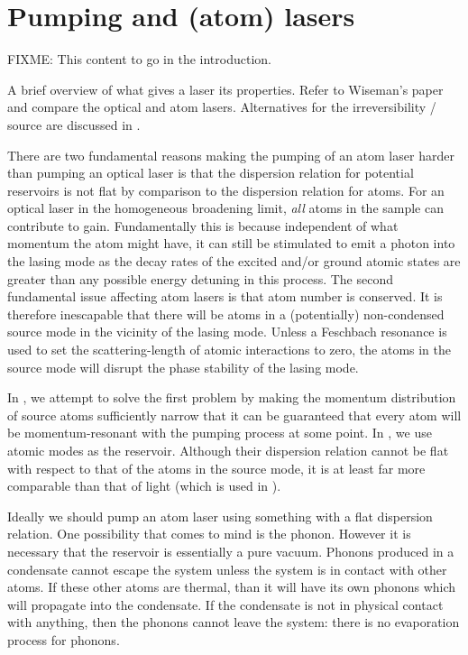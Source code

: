\section{Pumping and (atom) lasers}
\label{BackgroundTheory:Lasers}

FIXME: This content to go in the introduction.

A brief overview of what gives a laser its properties. Refer to Wiseman's paper~\citep{Wiseman:1997ba} and compare the optical and atom lasers. Alternatives for the irreversibility / source are discussed in .

There are two fundamental reasons making the pumping of an atom laser harder than pumping an optical laser is that the dispersion relation for potential reservoirs is not flat by comparison to the dispersion relation for atoms.  For an optical laser in the homogeneous broadening limit, \emph{all} atoms in the sample can contribute to gain.  Fundamentally this is because independent of what momentum the atom might have, it can still be stimulated to emit a photon into the lasing mode as the decay rates of the excited and/or ground atomic states are greater than any possible energy detuning in this process.  The second fundamental issue affecting atom lasers is that atom number is conserved.  It is therefore inescapable that there will be atoms in a (potentially) non-condensed source mode in the vicinity of the lasing mode.  Unless a Feschbach resonance is used to set the scattering-length of atomic interactions to zero, the atoms in the source mode will disrupt the phase stability of the lasing mode.

In , we attempt to solve the first problem by making the momentum distribution of source atoms sufficiently narrow that it can be guaranteed that every atom will be momentum-resonant with the pumping process at some point.  In , we use atomic modes as the reservoir.  Although their dispersion relation cannot be flat with respect to that of the atoms in the source mode, it is at least far more comparable than that of light (which is used in ).

Ideally we should pump an atom laser using something with a flat dispersion relation.  One possibility that comes to mind is the phonon.  However it is necessary that the reservoir is essentially a pure vacuum.  Phonons produced in a condensate cannot escape the system unless the system is in contact with other atoms.  If these other atoms are thermal, than it will have its own phonons which will propagate into the condensate.  If the condensate is not in physical contact with anything, then the phonons cannot leave the system: there is no evaporation process for phonons.

